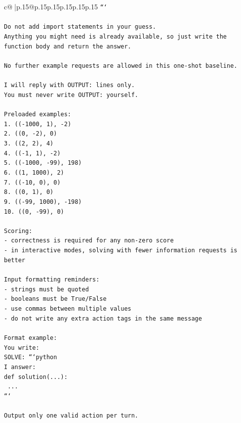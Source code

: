 \documentclass{article}
\begin{document}
{\begin{supertabular}{c@{$\;$}|p{.15\linewidth}@{}p{.15\linewidth}p{.15\linewidth}p{.15\linewidth}p{.15\linewidth}p{.15\linewidth}}
{{{\texttt{```} \\
\\ 
\texttt{Do not add import statements in your guess.} \\
\texttt{Anything you might need is already available, so just write the function body and return the answer.} \\
\\ 
\texttt{No further example requests are allowed in this one{-}shot baseline.} \\
\\ 
\texttt{I will reply with OUTPUT: lines only.} \\
\texttt{You must never write OUTPUT: yourself.} \\
\\ 
\texttt{Preloaded examples:} \\
\texttt{1. (({-}1000, 1), {-}2)} \\
\texttt{2. ((0, {-}2), 0)} \\
\texttt{3. ((2, 2), 4)} \\
\texttt{4. (({-}1, 1), {-}2)} \\
\texttt{5. (({-}1000, {-}99), 198)} \\
\texttt{6. ((1, 1000), 2)} \\
\texttt{7. (({-}10, 0), 0)} \\
\texttt{8. ((0, 1), 0)} \\
\texttt{9. (({-}99, 1000), {-}198)} \\
\texttt{10. ((0, {-}99), 0)} \\
\\ 
\texttt{Scoring:} \\
\texttt{{-} correctness is required for any non{-}zero score} \\
\texttt{{-} in interactive modes, solving with fewer information requests is better} \\
\\ 
\texttt{Input formatting reminders:} \\
\texttt{{-} strings must be quoted} \\
\texttt{{-} booleans must be True/False} \\
\texttt{{-} use commas between multiple values} \\
\texttt{{-} do not write any extra action tags in the same message} \\
\\ 
\texttt{Format example:} \\
\texttt{You write:} \\
\texttt{SOLVE: ```python} \\
\texttt{I answer:} \\
\texttt{def solution(...):} \\
\texttt{    ...} \\
\texttt{```} \\
\\ 
\texttt{Output only one valid action per turn.} \\
            }
        }
    }
     \\ \\


\end{supertabular}}
\end{document}
